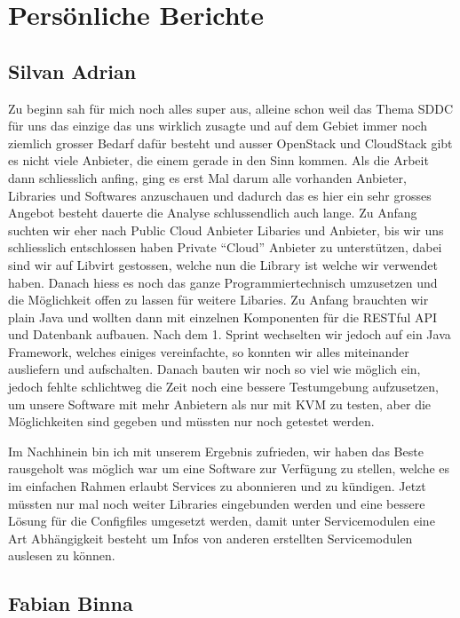 \chapter{Persönliche Berichte}

\section{Silvan Adrian}


Zu beginn sah für mich noch alles super aus, alleine schon weil das Thema SDDC für 
uns das einzige das uns wirklich zusagte und auf dem Gebiet immer noch ziemlich 
grosser Bedarf dafür besteht und ausser OpenStack und CloudStack gibt es nicht 
viele Anbieter, die einem gerade in den Sinn kommen.
Als die Arbeit dann schliesslich anfing, ging es erst Mal darum alle vorhanden 
Anbieter, Libraries und Softwares anzuschauen und dadurch das es hier ein sehr 
grosses Angebot besteht dauerte die Analyse schlussendlich auch lange.
Zu Anfang suchten wir eher nach Public Cloud Anbieter Libaries und Anbieter, bis 
wir uns schliesslich entschlossen haben Private ``Cloud'' Anbieter zu 
unterstützen, dabei sind wir auf Libvirt gestossen, welche nun die Library ist 
welche wir verwendet haben.
Danach hiess es noch das ganze Programmiertechnisch umzusetzen und die 
Möglichkeit offen zu lassen für weitere Libaries.
Zu Anfang brauchten wir plain Java und wollten dann mit einzelnen Komponenten für die 
RESTful API und Datenbank aufbauen.
Nach dem 1. Sprint wechselten wir jedoch auf ein Java Framework, welches einiges 
vereinfachte, so konnten wir alles miteinander ausliefern und aufschalten.
Danach bauten wir noch so viel wie möglich ein, jedoch fehlte schlichtweg die 
Zeit noch eine bessere Testumgebung aufzusetzen, um unsere Software mit mehr 
Anbietern als nur mit KVM zu testen, aber die Möglichkeiten sind gegeben und 
müssten nur noch getestet werden.

Im Nachhinein bin ich mit unserem Ergebnis zufrieden, wir haben das Beste 
rausgeholt was möglich war um eine Software zur Verfügung zu stellen, welche es 
im einfachen Rahmen erlaubt Services zu abonnieren und zu kündigen.
Jetzt müssten nur mal noch weiter Libraries eingebunden werden und eine bessere 
Lösung für die Configfiles umgesetzt werden, damit unter Servicemodulen eine Art 
Abhängigkeit besteht um Infos von anderen erstellten Servicemodulen auslesen zu 
können.


\section{Fabian Binna}

